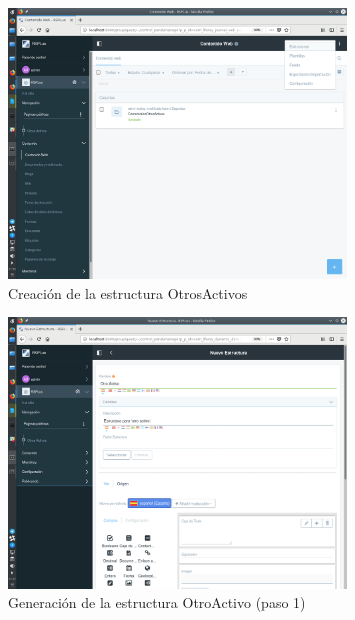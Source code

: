 \begin{figure}[H]
\begin{center}
\includegraphics[width=0.8\textwidth]{./img/liferay/7.png}
\end{center}
\caption{Creación de la estructura OtrosActivos}
\label{img:lr7}
\end{figure}

\begin{figure}[H]
\begin{center}
\includegraphics[width=0.8\textwidth]{./img/liferay/8.png}
\end{center}
\caption{Generación de la estructura OtroActivo (paso 1)}
\label{img:lr8}
\end{figure}

